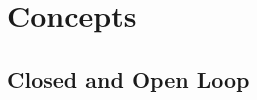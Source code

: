 \section{Concepts}
\label{sec:concepts}
\subsection{Closed and Open Loop}
\label{subsec:concepts-closed-open-loop}
\begin{frame}{\insertsubsection}
	
\end{frame}